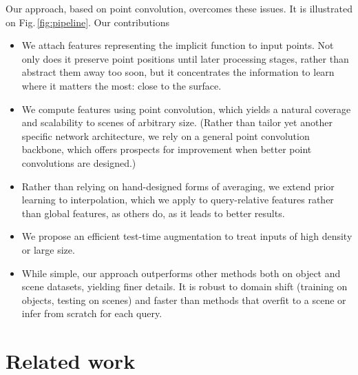\documentclass[10pt,twocolumn,letterpaper]{article}
\begin{document}
Our approach, based on point convolution, overcomes these issues. It is illustrated on Fig.\,\ref{fig:pipeline}. Our contributions 
\begin{itemize}[topsep=-2pt, itemsep=0pt]
    \item We attach features representing the implicit function to input points. Not only does it preserve point positions until later processing stages, rather than abstract them away too soon, but it concentrates the information to learn where it matters the most: close to the surface.
    
    \item We compute features using point convolution, which yields a natural coverage and scalability to scenes of arbitrary size. (Rather than tailor yet another specific network architecture, we rely on a general point convolution back\-bone, which offers prospects for improvement when better point convolutions are designed.)
    
    \item Rather than relying on hand-designed forms of averaging, we extend prior learning to interpolation, which we apply to query-relative features rather than global features, as others do, as it leads to better results.
    
    \item We propose an efficient test-time augmentation to treat inputs of high density or large size.
    
    \item While simple, our approach outperforms other methods both on object and scene datasets, yielding finer details.  It is robust to domain shift (training on objects, testing on scenes) and faster than methods that overfit to a scene or infer from scratch for each query.
\end{itemize}
 \section{Related work}
\label{sec:relwork}
\end{document}
